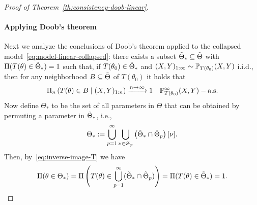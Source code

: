 \begin{proof}[Proof of Theorem~\ref{th:consistency-doob-linear}]
\paragraph{Applying Doob's theorem} Next we analyze the conclusions of Doob's theorem applied to the collapsed model~\eqref{eq:model-linear-collapsed}: there exists a subset \(\tilde{\Theta}_* \subseteq \tilde{\Theta}\) with \(\Pi(T(\theta)\in\tilde{\Theta}_*)=1\) such that, if \(T(\theta_0)\in \tilde{\Theta}_*\) and \((X,Y)_{1:\infty} \sim \mathbb{P}_{T(\theta_0)}(X, Y)\) i.i.d., then for any neighborhood \(B\subseteq \tilde{\Theta}\) of \(T(\theta_0)\) it holds that
\begin{equation}\label{eq:consistency-collapsed}
  \Pi_n\left(T(\theta) \in B \mid (X,Y)_{1:n}\right) \xrightarrow[]{n\to\infty} 1 \quad \mathbb{P}_{T(\theta_0)}^\infty(X, Y)-\text{a.s.}
\end{equation}
Now define \(\Theta_*\) to be the set of all parameters in \(\Theta\) that can be obtained by permuting a parameter in \(\tilde{\Theta}_*\), i.e., 
\[
  \Theta_* := \bigcup_{p=1}^\infty \bigcup_{\nu\in \mathfrak{S}_p}\left(\tilde{\Theta}_* \cap \tilde{\Theta}_p\right)[\nu].
\]
Then, by~\eqref{eq:inverse-image-T} we have
\[
  \Pi(\theta\in \Theta_*) = \Pi\left(T(\theta) \in \bigcup_{p=1}^\infty (\tilde{\Theta}_*\cap \tilde{\Theta}_p)\right) = \Pi(T(\theta)\in \tilde{\Theta}_*) = 1.
\]


\end{proof}

